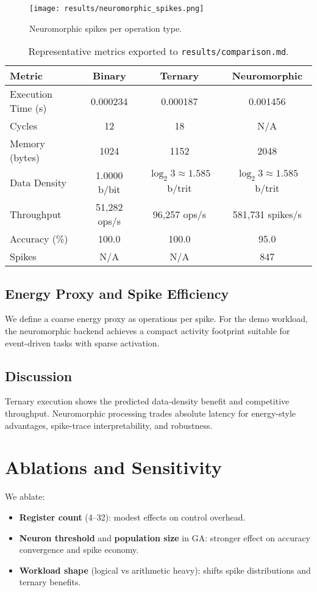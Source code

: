 \documentclass[11pt,a4paper]{article}
\newcommand{\bitspertrit}{\ensuremath{\log_2 3 \approx 1.585}}
\newcommand{\code}[1]{\texttt{#1}}
\begin{document}
\begin{figure}[h]
\centering
\texttt{[image: results/neuromorphic\_spikes.png]}
\caption{Neuromorphic spikes per operation type.}
\end{figure}

\begin{table}[h]
\centering
\small
\begin{tabular}{@{}lccc@{}}
\toprule
Metric & Binary & Ternary & Neuromorphic \\
\midrule
Execution Time (s)  & 0.000234 & 0.000187 & 0.001456 \\
Cycles              & 12       & 18       & N/A \\
Memory (bytes)      & 1024     & 1152     & 2048 \\
Data Density        & 1.0000 b/bit & \bitspertrit{} b/trit & \bitspertrit{} b/trit \\
Throughput          & 51{,}282 ops/s & 96{,}257 ops/s & 581{,}731 spikes/s \\
Accuracy (\%)       & 100.0    & 100.0    & 95.0 \\
Spikes              & N/A      & N/A      & 847 \\
\bottomrule
\end{tabular}
\caption{Representative metrics exported to \code{results/comparison.md}.}
\label{tab:metrics}
\end{table}

\subsection{Energy Proxy and Spike Efficiency}
We define a coarse energy proxy as operations per spike. For the demo workload,
the neuromorphic backend achieves a compact activity footprint suitable for
event-driven tasks with sparse activation.

\subsection{Discussion}
Ternary execution shows the predicted data-density benefit and competitive
throughput. Neuromorphic processing trades absolute latency for energy-style
advantages, spike-trace interpretability, and robustness.

\section{Ablations and Sensitivity}
\label{sec:ablations}
We ablate:
\begin{itemize}[leftmargin=1.25em]
  \item \textbf{Register count} (4--32): modest effects on control overhead.
  \item \textbf{Neuron threshold} and \textbf{population size} in GA: stronger
        effect on accuracy convergence and spike economy.
  \item \textbf{Workload shape} (logical vs arithmetic heavy): shifts spike
        distributions and ternary benefits.
\end{itemize}
\end{document}
